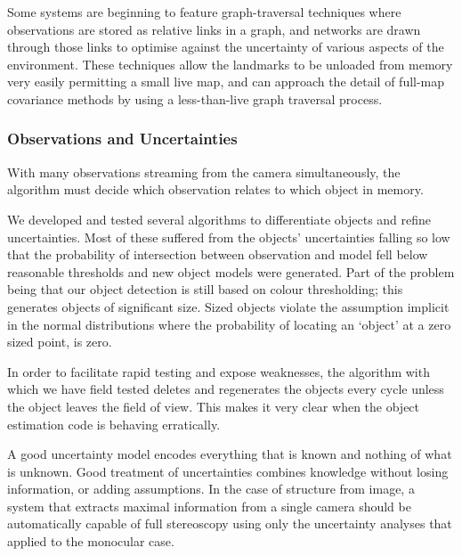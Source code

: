 \documentclass[a4paper, 11pt, titlepage]{article}
\newcounter{subsubsubsection}[subsubsection]
\begin{document}
      Some systems are beginning to feature graph-traversal techniques where observations are stored as relative links in a graph, and networks are drawn through those links to optimise against the uncertainty of various aspects of the environment.  These techniques allow the landmarks to be unloaded from memory very easily permitting a small live map, and can approach the detail of full-map covariance methods by using a less-than-live graph traversal process.

    \subsubsection{Observations and Uncertainties}
    \label{sec:ObsAndUnc}
        \label{sec:objectAllocation}
        With many observations streaming from the camera simultaneously, the algorithm must decide which observation relates to which object in memory.

        We developed and tested several algorithms to differentiate objects and refine uncertainties.
        Most of these suffered from the objects' uncertainties falling so low that the probability of intersection between observation and model fell below reasonable thresholds and new object models were generated.  Part of the problem being that our object detection is still based on colour thresholding; this generates objects of significant size.  Sized objects violate the assumption implicit in the normal distributions where the probability of locating an `object' at a zero sized point, is zero.

        In order to facilitate rapid testing and expose weaknesses, the algorithm with which we have field tested deletes and regenerates the objects every cycle unless the object leaves the field of view.  This makes it very clear when the object estimation code is behaving erratically.
        \label{sec:UncertaintyAnalysis}

        A good uncertainty model encodes everything that is known and nothing of what is unknown.  Good treatment of uncertainties combines knowledge without losing information, or adding assumptions.
        In the case of structure from image, a system that extracts maximal information from a single camera should be automatically capable of full stereoscopy using only the uncertainty analyses that applied to the monocular case.
      
\end{document}
